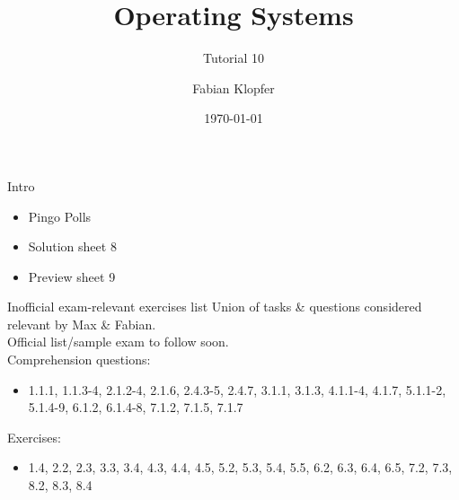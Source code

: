 \documentclass[10pt]{beamer}
\title{\textbf{Operating Systems}}
\subtitle{Tutorial 10}
\author{Fabian Klopfer}
\date{\today}
\begin{document}
        \frame{\titlepage}

        \begin{frame}{Intro}
            \begin{itemize}
                \item Pingo Polls
                \item Solution sheet 8
                \item Preview sheet 9
            \end{itemize}
        \end{frame}

        \begin{frame}{\alert{Inofficial} exam-relevant exercises list}
            Union of tasks \& questions considered relevant by Max \& Fabian. \vspace{0.3cm} \\
            Official list/sample exam to follow soon. \vspace{0.5cm} \\
            Comprehension questions:
            \begin{itemize}
                \item 1.1.1, 1.1.3-4, 2.1.2-4, 2.1.6, 2.4.3-5, 2.4.7, 3.1.1, 3.1.3, 4.1.1-4, 4.1.7, 5.1.1-2, 5.1.4-9, 6.1.2, 6.1.4-8, 7.1.2, 7.1.5, 7.1.7
            \end{itemize}

            Exercises:
            \begin{itemize}
                \item 1.4, 2.2, 2.3, 3.3, 3.4, 4.3, 4.4, 4.5, 5.2, 5.3, 5.4, 5.5, 6.2, 6.3, 6.4, 6.5, 7.2, 7.3, 8.2, 8.3, 8.4
            \end{itemize}
        \end{frame}
\end{document}
